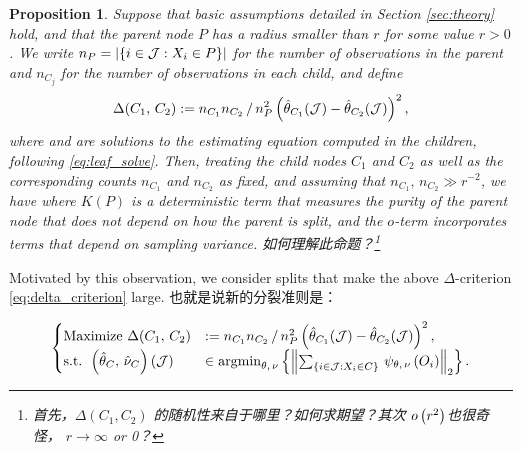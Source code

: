 \documentclass[aos]{imsart}
\theoremstyle{plain}
\newtheorem{prop}{Proposition}
\theoremstyle{definition}
\theoremstyle{remark}
\begin{document}
\begin{CJK}{UTF8}{gbsn}
\begin{prop}
\label{prop:motivation}
Suppose that basic assumptions detailed in Section \ref{sec:theory} hold,
and that the parent node $P$ has a radius smaller than
$r$ for some value $r > 0$. We write $n_P = \left\lvert\left\{i\in\mathcal{J} : X_i \in P\right\}\right\rvert$ for the number of
observations in the parent and $n_{C_j}$ for the number of observations in each child, and define
\begin{equation}
\label{eq:delta_criterion}
\Delta(C_1, \, C_2) := {n_{C_1} n_{C_2}}\,/\,{n_P^2}  \p{\htheta_{C_1}(\mathcal{J}) - \htheta_{C_2}(\mathcal{J})}^2,
\end{equation}
where  and  are solutions to the
estimating equation computed in the children, following \eqref{eq:leaf_solve}.
Then, treating the child nodes $C_1$ and $C_2$ as well as the corresponding counts $n_{C_1}$ and $n_{C_2}$
as fixed, and assuming that $n_{C_1}, \, n_{C_2} \gg r^{-2}$, we have
where $K(P)$ is a deterministic term that measures the purity of the parent node
that does not depend on how the parent is split, and the $o$-term incorporates terms that depend on
sampling variance. 如何理解此命题？\footnote{首先，$\Delta(C_1,C_2)$ 的随机性来自于哪里？如何求期望？其次 $o\left(r^2\right)$也很奇怪， $r \to \infty$ or 0？ }
\end{prop}

Motivated by this observation, we consider splits that make the above $\Delta$-criterion
\eqref{eq:delta_criterion} large.   也就是说新的分裂准则是：

\begin{equation*}
    \begin{cases}
    \text{Maximize  }  \Delta(C_1, \, C_2) &:= {n_{C_1} n_{C_2}}\,/\,{n_P^2}  \p{\htheta_{C_1}(\mathcal{J}) - \htheta_{C_2}(\mathcal{J})}^2, \\
     \text{s.t. }   \p{\htheta_{C}, \, \hnu_{C}}(\mathcal{J}) &\in \argmin_{\theta, \, \nu} \cb{\Norm{\sum_{\cb{i\in\mathcal{J} : X_i \in C}} \, \psi_{\theta, \, \nu}\p{O_i}}_2}.
    \end{cases}
\end{equation*}



\end{CJK}
\end{document}
